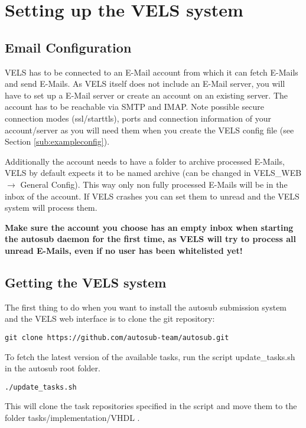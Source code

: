 \section{Setting up the VELS system} \label{system_setup}

\subsection{Email Configuration} \label{sub:emailconfig}
VELS has to be connected to an E-Mail account from which it can fetch E-Mails and send E-Mails.
As VELS itself does not include an E-Mail server, you will have to set up a E-Mail server or
create an account on an existing server. The account has to be reachable via SMTP and IMAP.
Note possible secure connection modes (ssl/starttls), ports and connection information of
your account/server as you will need them when you create the VELS config file (see
Section \ref{sub:exampleconfig}).

Additionally the account needs to have a folder to archive processed E-Mails, VELS by default
expects it to be named archive (can be changed in VELS\_WEB $\rightarrow$ General Config). This way
only non fully processed E-Mails will be in the inbox of the account. If VELS crashes
you can set them to unread and the VELS system will process them.

\textbf{Make sure the account you choose has an empty inbox when starting the autosub daemon for the
first time, as VELS will try to process all unread E-Mails, even if no user has been whitelisted yet!}

\subsection{Getting the VELS system} \label{sub:serversetup}

The first thing to do when you want to install the autosub submission system and the VELS
web interface is to clone the git repository:

\begin{verbatim}
git clone https://github.com/autosub-team/autosub.git
\end{verbatim}

To fetch the latest version of the available tasks, run the script update\_tasks.sh in the autosub root folder.
\begin{verbatim}
./update_tasks.sh
\end{verbatim}
This will clone the task repositories specified in the script and move them to the folder tasks/implementation/VHDL .

